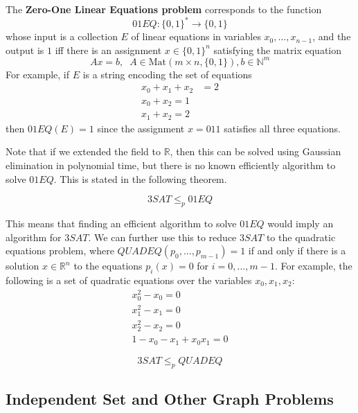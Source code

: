   \begin{definition}
  The \textbf{Zero-One Linear Equations problem} corresponds to the function 
  \[01EQ: \{0,1\}^* \longrightarrow \{0,1\}\]
  whose input is a collection $E$ of linear equations in variables $x_0, ..., x_{n-1}$, and the output is $1$ iff there is an assignment $x \in \{0,1\}^n$ satisfying the matrix equation
  \[A x = b, \;\; A \in \text{Mat}(m \times n, \{0,1\}), b \in \mathbb{N}^m\]
  For example, if $E$ is a string encoding the set of equations
  \begin{align*}
      x_0 + x_1 + x_2 & = 2 \\
      x_0 + x_2 = 1 \\
      x_1 + x_2 = 2
  \end{align*}
  then $01EQ(E) = 1$ since the assignment $x = 011$ satisfies all three equations.  
  \end{definition}

  Note that if we extended the field to $\mathbb{R}$, then this can be solved using Gaussian elimination in polynomial time, but there is no known efficiently algorithm to solve $01EQ$. This is stated in the following theorem. 

  \begin{theorem}
  \[3SAT \leq_p 01EQ\]
  \end{theorem}

  This means that finding an efficient algorithm to solve $01EQ$ would imply an algorithm for $3SAT$. We can further use this to reduce $3SAT$ to the quadratic equations problem, where $QUADEQ(p_0, ..., p_{m-1}) = 1$ if and only if there is a solution $x \in \mathbb{R}^n$ to the equations $p_i (x) = 0$ for $i = 0, ..., m-1$. For example, the following is a set of quadratic equations over the variables $x_0, x_1, x_2$: 
  \begin{align*}
      x_0^2 - x_0 = 0 \\
      x_1^2 - x_1 = 0 \\
      x_2^2 - x_2 = 0 \\
      1 - x_0 - x_1 + x_0 x_1 = 0
  \end{align*}

  \begin{theorem}
  \[3SAT \leq_p QUADEQ\]
  \end{theorem}

\subsection{Independent Set and Other Graph Problems}

